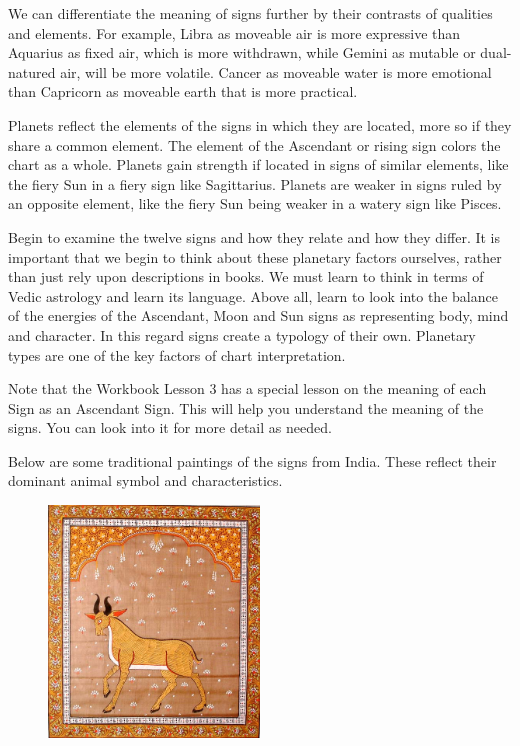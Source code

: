 
 

We can differentiate the meaning of signs further by their contrasts of qualities and elements. For example, Libra as moveable air is more expressive than Aquarius as fixed air, which is more withdrawn, while Gemini as mutable or dual-natured air, will be more volatile. Cancer as moveable water is more emotional than Capricorn as moveable earth that is more practical.

 

Planets reflect the elements of the signs in which they are located, more so if they share a common element. The element of the Ascendant or rising sign colors the chart as a whole. Planets gain strength if located in signs of similar elements, like the fiery Sun in a fiery sign like Sagittarius. Planets are weaker in signs ruled by an opposite element, like the fiery Sun being weaker in a watery sign like Pisces.

 

Begin to examine the twelve signs and how they relate and how they differ. It is important that we begin to think about these planetary factors ourselves, rather than just rely upon descriptions in books. We must learn to think in terms of Vedic astrology and learn its language. Above all, learn to look into the balance of the energies of the Ascendant, Moon and Sun signs as representing body, mind and character. In this regard signs create a typology of their own. Planetary types are one of the key factors of chart interpretation.

Note that the Workbook Lesson 3 has a special lesson on the meaning of each Sign as an Ascendant Sign. This will help you understand the meaning of the signs. You can look into it for more detail as needed.

 

 

Below are some traditional paintings of the signs from India. These reflect their dominant animal symbol and characteristics.

\begin{figure}[H]
 \centering
\includegraphics[width=0.5\textwidth]{pics/Aries.png}
 \end{figure}
 

